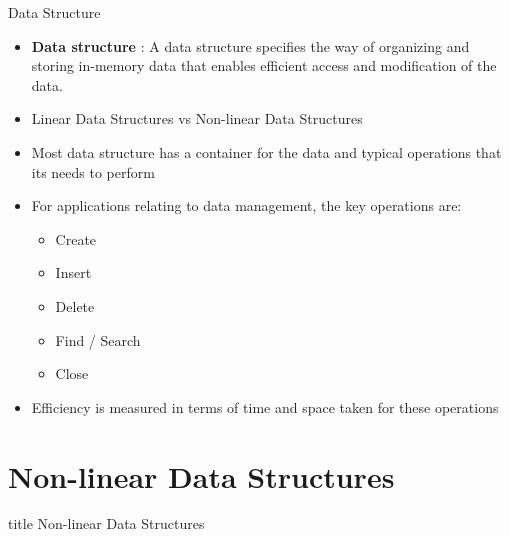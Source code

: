 \documentclass[aspectratio=169, xcolor=dvipsnames]{beamer}
\begin{document}
\begin{frame}{Data Structure}
    \begin{block}{}
        \begin{itemize}[<+->]
            \item \textbf{Data structure} : A data structure specifies the way of organizing and storing in-memory data that enables efficient access and modification of the data.
            \item Linear Data Structures vs Non-linear Data Structures
            \item Most data structure has a container for the data and typical operations that its needs to perform
            \item For applications relating to data management, the key operations are:
            \begin{itemize}[<+->]
                \item Create
                \item Insert
                \item Delete
                \item Find / Search
                \item Close
            \end{itemize}
            \item Efficiency is measured in terms of time and space taken for these operations
        \end{itemize}
    \end{block}
\end{frame}

\section{Non-linear Data Structures}
\begin{frame}
  \vfill
  \centering
  \begin{beamercolorbox}[sep=8pt,center,shadow=true,rounded=true]{title}
    Non-linear Data Structures\par%
  \end{beamercolorbox}
  \vfill
\end{frame}
\end{document}
